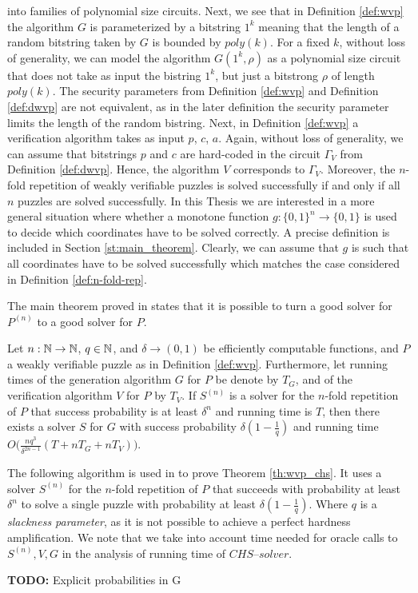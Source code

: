 into families of polynomial size circuits. Next, we see that in Definition \ref{def:wvp} the algorithm $G$ is parameterized by
a bitstring $1^k$ meaning that the length of a random bitstring taken by $G$ is bounded by $poly(k)$.
For a fixed $k$, without loss of generality, we can model the algorithm $G(1^k, \rho)$ as a polynomial size circuit
that does not take as input the bistring $1^k$, but just a bitstrong $\rho$ of length $\mathit{poly}(k)$.
The security parameters from Definition \ref{def:wvp} and Definition \ref{def:dwvp} are not equivalent,
as in the later definition the security parameter limits the length of the random bistring.
Next, in Definition \ref{def:wvp} a verification algorithm takes as input $p$, $c$, $a$.
Again, without loss of generality, we can assume that bitstrings $p$ and $c$ are hard-coded
in the circuit $\Gamma_V$ from Definition \ref{def:dwvp}. Hence, the algorithm $V$ corresponds to $\Gamma_V$.
Moreover, the $n$-fold repetition of weakly verifiable puzzles is solved successfully if and only if all $n$ puzzles are solved successfully.
In this Thesis we are interested in a more general situation where whether a monotone function $g: \{0,1\}^{n} \rightarrow \{0,1\}$ is used to decide
which coordinates have to be solved correctly. A precise definition is included in Section \ref{st:main_theorem}.
Clearly, we can assume that $g$ is such that all coordinates have to be solved successfully which matches the case considered in Definition \ref{def:n-fold-rep}.

The main theorem proved in \cite{canetti2004hardness} states that it is possible to turn a good solver for
$P^{(n)}$ to a good solver for $P$.
%
\begin{theorem}
  \label{thm:wvp_chs}
Let $n:\mathbb{N} \rightarrow \mathbb{N}$, $q \in \mathbb{N}$, and $\delta \rightarrow (0,1)$ be efficiently computable functions,
and $P$ a weakly verifiable puzzle as in Definition \ref{def:wvp}.
Furthermore, let running times of the generation algorithm $G$ for $P$ be denote by $T_G$, and of the verification algorithm $V$ for $P$ by $T_V$.
If $S^{(n)}$ is a solver for the $n$-fold repetition of $P$ that success probability is at least $\delta^{n}$
and running time is $T$, then there exists a solver $S$ for $G$ with success probability $\delta(1-\frac{1}{q})$ and running time
$O\Big(\frac{nq^3}{\delta^{2n-1}}(T + nT_G + nT_V)\Big)$.
\end{theorem}
%
The following algorithm is used in \cite{canetti2004hardness} to prove Theorem \ref{th:wvp_chs}.
It uses a solver $S^{(n)}$ for the $n$-fold repetition of $P$ that succeeds with probability at least $\delta^{n}$
to solve a single puzzle with probability at least $\delta(1  - \frac{1}{q})$.
Where $q$ is a \textit{slackness parameter}, as it is not possible to achieve a perfect hardness amplification.
We note that we take into account time needed for oracle calls to $S^{(n)}, V, G$ in the analysis of running time of $\mathit{CHS\text{--}solver}$.
%
\begin{todo}
  \textbf{TODO:} Explicit probabilities in G
\end{todo}

